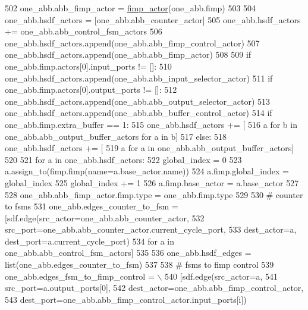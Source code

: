 \begin{DoxyCode}
502     one\_abb.abb\_fimp\_actor = \hyperlink{namespacesylva_1_1code__generation_1_1air_a5a82ebeeb6def57b9dc6784ab9cd43f4}{fimp\_actor}(one\_abb.fimp)
503 
504     one\_abb.hsdf\_actors = [one\_abb.abb\_counter\_actor]
505     one\_abb.hsdf\_actors += one\_abb.abb\_control\_fsm\_actors
506     one\_abb.hsdf\_actors.append(one\_abb.abb\_fimp\_control\_actor)
507     one\_abb.hsdf\_actors.append(one\_abb.abb\_fimp\_actor)
508 
509     \textcolor{keywordflow}{if} one\_abb.fimp.actors[0].input\_ports != []:
510         one\_abb.hsdf\_actors.append(one\_abb.abb\_input\_selector\_actor)
511     \textcolor{keywordflow}{if} one\_abb.fimp.actors[0].output\_ports != []:
512         one\_abb.hsdf\_actors.append(one\_abb.abb\_output\_selector\_actor)
513         one\_abb.hsdf\_actors.append(one\_abb.abb\_buffer\_control\_actor)
514         \textcolor{keywordflow}{if} one\_abb.fimp.extra\_buffer == 1:
515             one\_abb.hsdf\_actors += [
516                 a \textcolor{keywordflow}{for} b \textcolor{keywordflow}{in} one\_abb.abb\_output\_buffer\_actors \textcolor{keywordflow}{for} a \textcolor{keywordflow}{in} b]
517         \textcolor{keywordflow}{else}:
518             one\_abb.hsdf\_actors += [
519                 a \textcolor{keywordflow}{for} a \textcolor{keywordflow}{in} one\_abb.abb\_output\_buffer\_actors]
520 
521     \textcolor{keywordflow}{for} a \textcolor{keywordflow}{in} one\_abb.hsdf\_actors:
522         global\_index = 0
523         a.assign\_to(fimp.fimp(name=a.base\_actor.name))
524         a.fimp.global\_index = global\_index
525         global\_index += 1
526         a.fimp.base\_actor = a.base\_actor
527 
528     one\_abb.abb\_fimp\_actor.fimp.type = one\_abb.fimp.type
529 
530     \textcolor{comment}{# counter to fsms}
531     one\_abb.edges\_counter\_to\_fsm = [sdf.edge(src\_actor=one\_abb.abb\_counter\_actor,
532                                              src\_port=one\_abb.abb\_counter\_actor.current\_cycle\_port,
533                                              dest\_actor=a, dest\_port=a.current\_cycle\_port)
534                                     \textcolor{keywordflow}{for} a \textcolor{keywordflow}{in} one\_abb.abb\_control\_fsm\_actors]
535 
536     one\_abb.hsdf\_edges = list(one\_abb.edges\_counter\_to\_fsm)
537 
538     \textcolor{comment}{# fsms to fimp control}
539     one\_abb.edges\_fsm\_to\_fimp\_control = \(\backslash\)
540         [sdf.edge(src\_actor=a,
541                   src\_port=a.output\_ports[0],
542                   dest\_actor=one\_abb.abb\_fimp\_control\_actor,
543                   dest\_port=one\_abb.abb\_fimp\_control\_actor.input\_ports[i])

\end{DoxyCode}
